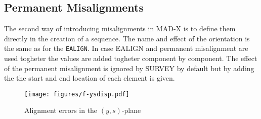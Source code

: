 \subsection{Permanent Misalignments}
The second way of introducing misalignments in MAD-X is
to define them directly in the creation of a sequence. The name 
and effect of the orientation is the same as for the \texttt{EALIGN}. 
In case EALIGN and permanent misalignment are used togheter the values 
are added togheter component by component. The effect of the permanent misalignment
is ignored by SURVEY by default but by adding the  the 
start and end location of each element is given. 

\begin{figure}[ht]
	\centering
	\setlength{\unitlength}{1pt}
	\texttt{[image: figures/f-ysdisp.pdf]}
	\caption{Alignment errors in the $(y,s)$-plane}
	\label{F-YSDISP}
\end{figure}

